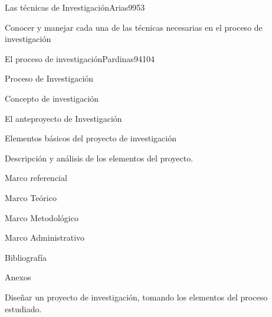 \begin{syllabus}
\begin{unit}{Las técnicas de Investigación}{Arias99}{5}{3}
   \begin{learningoutcomes}
      \item Conocer y manejar cada una de las técnicas necesarias en el proceso de investigación
   \end{learningoutcomes}
\end{unit}

\begin{unit}{El proceso de investigación}{Pardinas94}{10}{4}
   \begin{topics}
      \item Proceso de Investigación
	\item Concepto de investigación
	\item El anteproyecto de Investigación 
	\item Elementos básicos del proyecto de investigación
	\item Descripción y análisis de los elementos del proyecto.
	\item Marco referencial
	\item Marco Teórico
	\item Marco Metodológico
	\item Marco Administrativo
	\item Bibliografía 
	\item Anexos
   \end{topics}

   \begin{learningoutcomes}
      \item Diseñar un proyecto de investigación, tomando los elementos del proceso estudiado.
   \end{learningoutcomes}
\end{unit}

\begin{coursebibliography}
\end{coursebibliography}
\end{syllabus}
